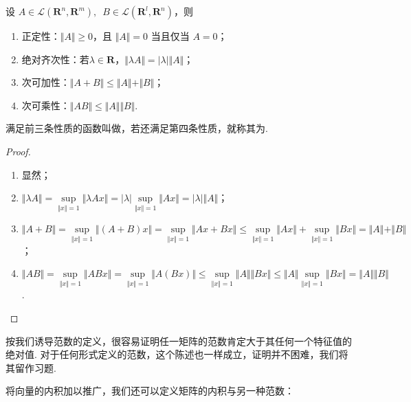 \begin{theorem}{}{}
    设 $A\in \mathcal{L}(\mathbf{R}^n, \mathbf{R}^m),\enspace B\in \mathcal{L}(\mathbf{R}^l, \mathbf{R}^n)$，则
    \begin{enumerate}
        \item 正定性：$\Vert A\Vert\geqslant 0$，且 $\Vert A\Vert=0$ 当且仅当 $A=0$；
        \item 绝对齐次性：若$\lambda\in \mathbf{R}$，$\Vert \lambda A\Vert = \vert\lambda\vert \Vert A\Vert$；
        \item 次可加性：$\Vert A+B\Vert\leqslant\Vert A\Vert+\Vert B\Vert$；
        \item 次可乘性：$\Vert AB\Vert\leqslant\Vert A\Vert\Vert B\Vert$.
    \end{enumerate}
\end{theorem}

满足前三条性质的函数叫做，若还满足第四条性质，就称其为.

\begin{proof}
    \begin{enumerate}
        \item 显然；
        \item $\Vert \lambda A\Vert=\sup\limits_{\Vert x\Vert =  1}\Vert \lambda Ax\Vert = \vert\lambda\vert \sup\limits_{\Vert x\Vert = 1}\Vert Ax\Vert = \vert\lambda\vert \Vert A\Vert$；
        \item $\Vert A+B\Vert=\sup\limits_{\Vert x\Vert = 1}\Vert (A+B)x\Vert = \sup\limits_{\Vert x\Vert = 1}\Vert Ax + Bx\Vert\leqslant\sup\limits_{\Vert x\Vert = 1}\Vert Ax\Vert+\sup\limits_{\Vert x\Vert = 1}\Vert Bx\Vert=\Vert A\Vert+\Vert B\Vert$；
        \item $\Vert AB\Vert=\sup\limits_{\Vert x\Vert = 1}\Vert ABx\Vert=\sup\limits_{\Vert x\Vert = 1}\Vert A(Bx)\Vert\leqslant\sup\limits_{\Vert x\Vert = 1}\Vert A\Vert\Vert Bx\Vert\leqslant\Vert A\Vert\sup\limits_{\Vert x\Vert = 1}\Vert Bx\Vert=\Vert A\Vert\Vert B\Vert$.
    \end{enumerate}
\end{proof}

按我们诱导范数的定义，很容易证明任一矩阵的范数肯定大于其任何一个特征值的绝对值. 对于任何形式定义的范数，这个陈述也一样成立，证明并不困难，我们将其留作习题.


将向量的内积加以推广，我们还可以定义矩阵的内积与另一种范数：

